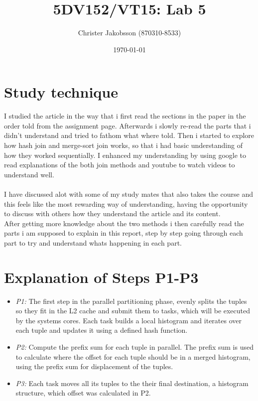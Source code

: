 \documentclass[a4paper,12pt]{article}
\begin{document}
\title{5DV152/VT15: Lab 5}
\author{Christer Jakobsson (870310-8533)}
\date{\today}
\maketitle
  

\section{Study technique}

I studied the article in the way that i first read the sections in the paper in the order told from the assignment page.
Afterwards i slowly re-read the parts that i didn't understand and tried to fathom what where told.
Then i started to explore how hash join and merge-sort join works, so that i had basic understanding of how they worked sequentially.
I enhanced my understanding by using google to read explanations of the both join methods and youtube to watch videos to understand well.
\\\\
I have discussed alot with some of my study mates that also takes the course and this feels like the most rewarding way of understanding, having the opportunity to discuss with others how they understand the article and its content.
\\
After getting more knowledge about the two methods i then carefully read the parts i am supposed to explain in this report, step by step going through each part to try and understand whats happening in each part.

\section{Explanation of Steps P1-P3}
\label{sec:exp}

\begin{itemize}
 \item \emph{P1:} The first step in the parallel partitioning phase, evenly splits the tuples so they fit in the L2 cache and submit them to tasks, which will be executed by the systems cores. Each task builds a local histogram and iterates over each tuple and updates it using a defined hash function.
 \item \emph{P2:} Compute the prefix sum for each tuple in parallel. The prefix sum is used to calculate where the offset for each tuple should be in a merged histogram, using the prefix sum for displacement of the tuples. 
 \item \emph{P3:} Each task moves all its tuples to the their final destination, a histogram structure, which offset was calculated in P2.
\end{itemize}
\end{document}
